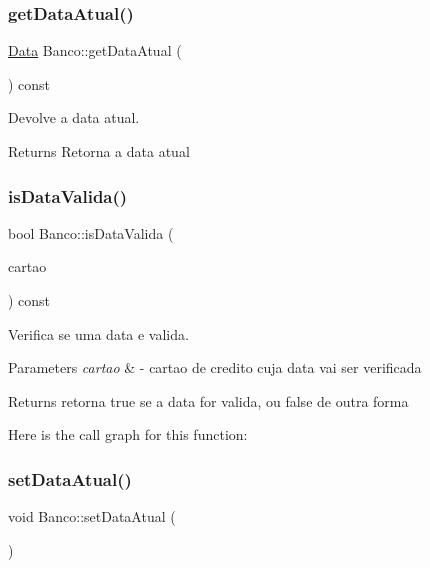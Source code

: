 \subsubsection{\texorpdfstring{get\+Data\+Atual()}{getDataAtual()}}
{\footnotesize\ttfamily \mbox{\hyperlink{class_data}{Data}} Banco\+::get\+Data\+Atual (\begin{DoxyParamCaption}{ }\end{DoxyParamCaption}) const}



Devolve a data atual. 

\begin{DoxyReturn}{Returns}
Retorna a data atual 
\end{DoxyReturn}
\mbox{\label{class_banco_ac469cc9db5980081701bf9eb27a7e612}} 
\subsubsection{\texorpdfstring{is\+Data\+Valida()}{isDataValida()}}
{\footnotesize\ttfamily bool Banco\+::is\+Data\+Valida (\begin{DoxyParamCaption}\item[{const \mbox{\hyperlink{class_cartao_credito}{Cartao\+Credito}} \&}]{cartao }\end{DoxyParamCaption}) const}



Verifica se uma data e valida. 


\begin{DoxyParams}{Parameters}
{\em cartao} & -\/ cartao de credito cuja data vai ser verificada \\
\hline
\end{DoxyParams}
\begin{DoxyReturn}{Returns}
retorna true se a data for valida, ou false de outra forma 
\end{DoxyReturn}
Here is the call graph for this function\+:
\mbox{\label{class_banco_a227af53b49995242c06d89bb10ffc8ea}} 
\subsubsection{\texorpdfstring{set\+Data\+Atual()}{setDataAtual()}}
{\footnotesize\ttfamily void Banco\+::set\+Data\+Atual (\begin{DoxyParamCaption}{ }\end{DoxyParamCaption})}



